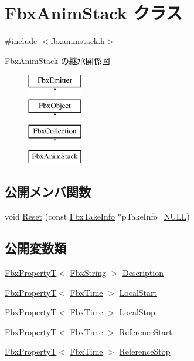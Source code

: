 \hypertarget{class_fbx_anim_stack}{}\section{Fbx\+Anim\+Stack クラス}
\label{class_fbx_anim_stack}


{\ttfamily \#include $<$fbxanimstack.\+h$>$}

Fbx\+Anim\+Stack の継承関係図\begin{figure}[H]
\begin{center}
\leavevmode
\includegraphics[height=4.000000cm]{class_fbx_anim_stack}
\end{center}
\end{figure}
\subsection*{公開メンバ関数}
\begin{DoxyCompactItemize}
\item 
void \hyperlink{class_fbx_anim_stack_a69f6d38a6b4fa348585674e5d68464b2}{Reset} (const \hyperlink{class_fbx_take_info}{Fbx\+Take\+Info} $\ast$p\+Take\+Info=\hyperlink{fbxarch_8h_a070d2ce7b6bb7e5c05602aa8c308d0c4}{N\+U\+LL})
\end{DoxyCompactItemize}
\subsection*{公開変数類}
\begin{DoxyCompactItemize}
\item 
\hyperlink{class_fbx_property_t}{Fbx\+PropertyT}$<$ \hyperlink{class_fbx_string}{Fbx\+String} $>$ \hyperlink{class_fbx_anim_stack_a87abfeabeaa31a44e2474f01d4501b7f}{Description}
\item 
\hyperlink{class_fbx_property_t}{Fbx\+PropertyT}$<$ \hyperlink{class_fbx_time}{Fbx\+Time} $>$ \hyperlink{class_fbx_anim_stack_a140ba636c0907144d60d2901c0995456}{Local\+Start}
\item 
\hyperlink{class_fbx_property_t}{Fbx\+PropertyT}$<$ \hyperlink{class_fbx_time}{Fbx\+Time} $>$ \hyperlink{class_fbx_anim_stack_a07be87cbd6b3226be489c69b5466a72d}{Local\+Stop}
\item 
\hyperlink{class_fbx_property_t}{Fbx\+PropertyT}$<$ \hyperlink{class_fbx_time}{Fbx\+Time} $>$ \hyperlink{class_fbx_anim_stack_adeac4e2557e00ccd420eb9b790377e22}{Reference\+Start}
\item 
\hyperlink{class_fbx_property_t}{Fbx\+PropertyT}$<$ \hyperlink{class_fbx_time}{Fbx\+Time} $>$ \hyperlink{class_fbx_anim_stack_a480a3b46ab895a740ee658e7022ec208}{Reference\+Stop}
\end{DoxyCompactItemize}

